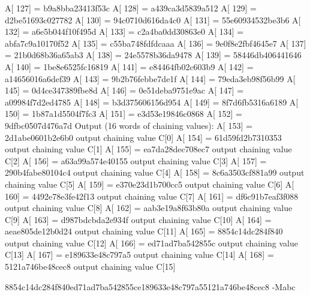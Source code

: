 A[ 127] = b9a8bba23413f53c
A[ 128] = a439ca3d5839a512
A[ 129] = d2be51693c027782
A[ 130] = 94c0710d616da4c0
A[ 131] = 55e60934532be3b6
A[ 132] = a6e5b044f10f495d
A[ 133] = c2a4ba0dd30863e0
A[ 134] = abfa7c9a10170f52
A[ 135] = c55ba748fdfdcaaa
A[ 136] = 9e0f8e2fbf4645e7
A[ 137] = 21b0d68b36a65ab3
A[ 138] = 24e5578b36da9478
A[ 139] = 58446db406441646
A[ 140] = 1be8e6525fc16819
A[ 141] = e84464fb02c603b9
A[ 142] = a14656016a6def39
A[ 143] = 9b2b76febbe7de1f
A[ 144] = 79eda3eb98f56b99
A[ 145] = 0d4ce347389fbe8d
A[ 146] = 0e51deba9751e9ac
A[ 147] = a09984f7d2ed4785
A[ 148] = b3d375606156d954
A[ 149] = 8f7d6fb5316a6189
A[ 150] = 1b87a1d5504f7fc3
A[ 151] = e3d53e19846c0868
A[ 152] = 9dfbc0507d476a7d
Output (16 words of chaining values):
A[ 153] = 2d1abe0601b2e6b0 output chaining value C[0]
A[ 154] = 61d59fd2b7310353 output chaining value C[1]
A[ 155] = ea7da28dec708ec7 output chaining value C[2]
A[ 156] = a63a99a574e40155 output chaining value C[3]
A[ 157] = 290b4fabe80104c4 output chaining value C[4]
A[ 158] = 8c6a3503cf881a99 output chaining value C[5]
A[ 159] = e370e23d1b700cc5 output chaining value C[6]
A[ 160] = 4492e78e3fe42f13 output chaining value C[7]
A[ 161] = df6c91b7eaf3f088 output chaining value C[8]
A[ 162] = aab3e19a8f63b80a output chaining value C[9]
A[ 163] = d987bdcbda2e934f output chaining value C[10]
A[ 164] = aeae805de12b0d24 output chaining value C[11]
A[ 165] = 8854c14dc284f840 output chaining value C[12]
A[ 166] = ed71ad7ba542855c output chaining value C[13]
A[ 167] = e189633e48c797a5 output chaining value C[14]
A[ 168] = 5121a746be48cec8 output chaining value C[15]

8854c14dc284f840ed71ad7ba542855ce189633e48c797a55121a746be48cec8 -Mabc
